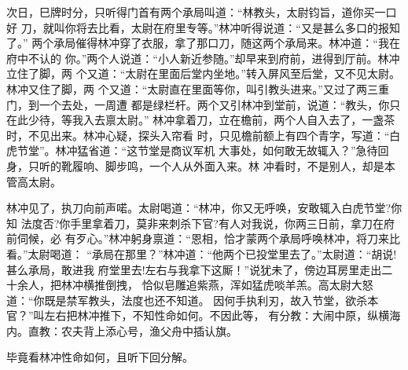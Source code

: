 次日，巳牌时分，只听得门首有两个承局叫道：“林教头，太尉钧旨，道你买一口好
刀，就叫你将去比看，太尉在府里专等。”林冲听得说道：“又是甚么多口的报知了。”
两个承局催得林冲穿了衣服，拿了那口刀，随这两个承局来。林冲道：“我在府中不认的
你。”两个人说道：“小人新近参随。”却早来到府前，进得到厅前。林冲立住了脚，两
个又道：“太尉在里面后堂内坐地。”转入屏风至后堂，又不见太尉。林冲又住了脚，两
个又道：“太尉直在里面等你，叫引教头进来。”又过了两三重门，到一个去处，一周遭
都是绿栏杆。两个又引林冲到堂前，说道：“教头，你只在此少待，等我入去禀太尉。”
林冲拿着刀，立在檐前，两个人自入去了，一盏茶时，不见出来。林冲心疑，探头入帘看
时，只见檐前额上有四个青字，写道：“白虎节堂”。林冲猛省道：“这节堂是商议军机
大事处，如何敢无故辄入？”急待回身，只听的靴履响、脚步鸣，一个人从外面入来。林
冲看时，不是别人，却是本管高太尉。

林冲见了，执刀向前声喏。太尉喝道：“林冲，你又无呼唤，安敢辄入白虎节堂?你知
法度否?你手里拿着刀，莫非来刺杀下官?有人对我说，你两三日前，拿刀在府前伺候，必
有歹心。”林冲躬身禀道：“恩相，恰才蒙两个承局呼唤林冲，将刀来比看。”太尉喝道：
“承局在那里？”林冲道：“他两个已投堂里去了。”太尉道：“胡说!甚么承局，敢进我
府堂里去!左右与我拿下这厮！”说犹未了，傍边耳房里走出二十余人，把林冲横推倒拽，
恰似皂雕追紫燕，浑如猛虎啖羊羔。高太尉大怒道：“你既是禁军教头，法度也还不知道。
因何手执利刃，故入节堂，欲杀本官？”叫左右把林冲推下，不知性命如何。不因此等，
有分教：大闹中原，纵横海内。直教：农夫背上添心号，渔父舟中插认旗。

毕竟看林冲性命如何，且听下回分解。